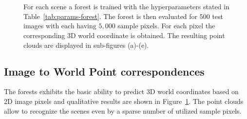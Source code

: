 \documentclass[final]{cvpr}
\begin{document}
\begin{figure}
	\begin{center}
	
	\,
	\,
	\\
	\,
	\,

	\end{center}
	\caption{For each scene a forest is trained with the hyperparameters stated in Table~\ref{tab:params-forest}. The forest 
	is then evaluated for $500$ test images with each having $5,000$ sample pixels. For each pixel the corresponding
	3D world coordinate is obtained. The resulting point clouds are displayed in sub-figures (a)-(e). }
	\label{fig:pointclouds}
\end{figure}

\subsection{Image to World Point correspondences} \label{subsec:eval-forest}
The forests exhibits the basic ability to predict 3D world coordinates based on 2D image pixels and 
qualitative results are shown in Figure~\ref{fig:pointclouds}. The point clouds 
allow to recognize the scenes even by a sparse number of utilized sample pixels. 
\end{document}
